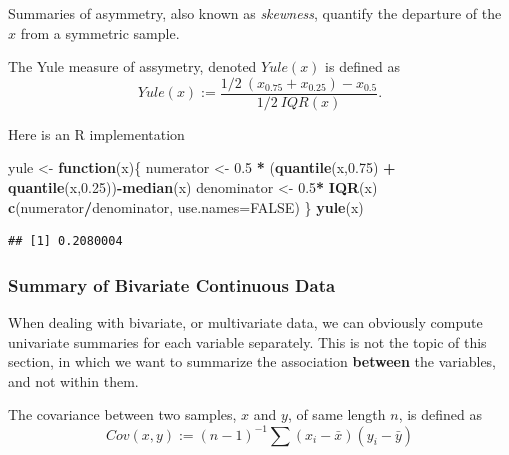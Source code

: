 \documentclass[]{book}
\newenvironment{Shaded}{\begin{snugshade}}{\end{snugshade}}
\newcommand{\KeywordTok}[1]{\textcolor[rgb]{0.13,0.29,0.53}{\textbf{#1}}}
\newcommand{\DataTypeTok}[1]{\textcolor[rgb]{0.13,0.29,0.53}{#1}}
\newcommand{\FloatTok}[1]{\textcolor[rgb]{0.00,0.00,0.81}{#1}}
\newcommand{\StringTok}[1]{\textcolor[rgb]{0.31,0.60,0.02}{#1}}
\newcommand{\OtherTok}[1]{\textcolor[rgb]{0.56,0.35,0.01}{#1}}
\newcommand{\ControlFlowTok}[1]{\textcolor[rgb]{0.13,0.29,0.53}{\textbf{#1}}}
\newcommand{\OperatorTok}[1]{\textcolor[rgb]{0.81,0.36,0.00}{\textbf{#1}}}
\newcommand{\NormalTok}[1]{#1}
\theoremstyle{definition}
\theoremstyle{definition}
\theoremstyle{definition}
\theoremstyle{remark}
\let\BeginKnitrBlock\begin \let\EndKnitrBlock\end
\begin{document}
Summaries of asymmetry, also known as \emph{skewness}, quantify the
departure of the \(x\) from a symmetric sample.

\BeginKnitrBlock{definition}[Yule]
\protect\hypertarget{def:unnamed-chunk-124}{}{\label{def:unnamed-chunk-124}
{} }The Yule measure of assymetry, denoted
\(Yule(x)\) is defined as
\[Yule(x) := \frac{1/2 \: (x_{0.75}+x_{0.25}) - x_{0.5} }{1/2 \: IQR(x)} .\]
\EndKnitrBlock{definition}

Here is an R implementation

\begin{Shaded}
\begin{Highlighting}[]
\NormalTok{yule <-}\StringTok{ }\ControlFlowTok{function}\NormalTok{(x)\{}
\NormalTok{  numerator <-}\StringTok{ }\FloatTok{0.5} \OperatorTok{*}\StringTok{ }\NormalTok{(}\KeywordTok{quantile}\NormalTok{(x,}\FloatTok{0.75}\NormalTok{) }\OperatorTok{+}\StringTok{ }\KeywordTok{quantile}\NormalTok{(x,}\FloatTok{0.25}\NormalTok{))}\OperatorTok{-}\KeywordTok{median}\NormalTok{(x) }
\NormalTok{  denominator <-}\StringTok{ }\FloatTok{0.5}\OperatorTok{*}\StringTok{ }\KeywordTok{IQR}\NormalTok{(x)}
  \KeywordTok{c}\NormalTok{(numerator}\OperatorTok{/}\NormalTok{denominator, }\DataTypeTok{use.names=}\OtherTok{FALSE}\NormalTok{)}
\NormalTok{\}}
\KeywordTok{yule}\NormalTok{(x)}
\end{Highlighting}
\end{Shaded}

\begin{verbatim}
## [1] 0.2080004
\end{verbatim}

\subsubsection{Summary of Bivariate Continuous
Data}\label{summary-of-bivariate-continuous-data}

When dealing with bivariate, or multivariate data, we can obviously
compute univariate summaries for each variable separately. This is not
the topic of this section, in which we want to summarize the association
\textbf{between} the variables, and not within them.

\BeginKnitrBlock{definition}[Covariance]
\protect\hypertarget{def:unnamed-chunk-125}{}{\label{def:unnamed-chunk-125}
{} }The covariance between two samples, \(x\)
and \(y\), of same length \(n\), is defined as
\[Cov(x,y):= (n-1)^{-1} \sum (x_i-\bar x)(y_i-\bar y)  \]
\EndKnitrBlock{definition}
\end{document}

